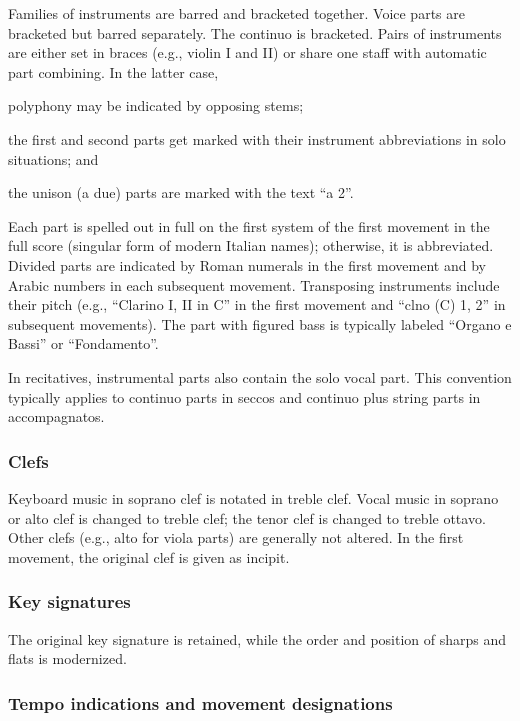 \documentclass{ees}
\begin{document}
Families of instruments are barred and bracketed together. Voice parts are bracketed but barred separately. The continuo is bracketed. Pairs of instruments are either set in braces (e.g., violin I and II) or share one staff with automatic part combining. In the latter case,
\begin{bulletlist}
  \item polyphony may be indicated by opposing stems;
  \item the first and second parts get marked with their instrument abbreviations in solo situations; and
  \item the unison (a due) parts are marked with the text “a 2”.
\end{bulletlist}

Each part is spelled out in full on the first system of the first movement in the full score (singular form of modern Italian names); otherwise, it is abbreviated. Divided parts are indicated by Roman numerals in the first movement and by Arabic numbers in each subsequent movement. Transposing instruments include their pitch (e.g., “Clarino I, II in C” in the first movement and “clno (C) 1, 2” in subsequent movements). The part with figured bass is typically labeled “Organo e Bassi” or “Fondamento”.

In recitatives, instrumental parts also contain the solo vocal part. This convention typically applies to continuo parts in seccos and continuo plus string parts in accompagnatos.


\subsubsection{Clefs}

Keyboard music in soprano clef is notated in treble clef. Vocal music in soprano or alto clef is changed to treble clef; the tenor clef is changed to treble ottavo. Other clefs (e.g., alto for viola parts) are generally not altered. In the first movement, the original clef is given as incipit.


\subsubsection{Key signatures}

The original key signature is retained, while the order and position of sharps and flats is modernized.


\subsubsection{Tempo indications and movement designations}
\end{document}

